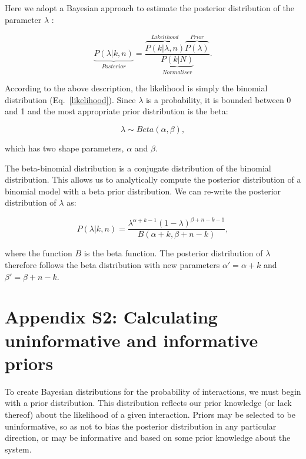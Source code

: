 \documentclass[12pt]{article}
\begin{document}
    Here we adopt a Bayesian approach to estimate the posterior distribution of the parameter $\lambda$ :

    \begin{equation}
      \underbrace{P(\lambda|k,n)}_{Posterior} = \frac{\overbrace{P(k|\lambda,n)}^{Likelihood}\overbrace{P(\lambda)}^{Prior}}{\underbrace{P(k|N)}_{Normaliser}} .
      \label{posterior}
    \end{equation}

    According to the above description, the likelihood is simply the binomial distribution (Eq.~\ref{likelihood}). Since $\lambda$ is a probability, it is bounded between 0 and 1 and the most appropriate prior distribution is the beta:

    \begin{equation}
      \lambda \sim Beta(\alpha,\beta) , \label{prior}
    \end{equation}

    \noindent which has two shape parameters, $\alpha$ and $\beta$. 

   The beta-binomial distribution is a conjugate distribution of the binomial distribution. This allows us to analytically compute the posterior distribution of a binomial model with a beta prior distribution. We can re-write the posterior distribution of $\lambda$ as:

    \begin{equation}
      P(\lambda|k,n) = \frac{\lambda^{\alpha+k-1}(1-\lambda)^{\beta+n-k-1}}{B(\alpha+k,\beta+n-k)} , \label{posterior2}
    \end{equation}

    
    \noindent where the function $B$ is the beta function. The posterior distribution of $\lambda$ therefore follows the beta distribution with new parameters $\alpha'= \alpha+k$ and $\beta'=\beta+n-k$. 

\clearpage

\section*{Appendix S2: Calculating uninformative and informative priors}

    To create Bayesian distributions for the probability of interactions, we must begin with a prior distribution. This distribution reflects our prior knowledge (or lack thereof) about the likelihood of a given interaction. Priors may be selected to be uninformative, so as not to bias the posterior distribution in any particular direction, or may be informative and based on some prior knowledge about the system.
\end{document}

